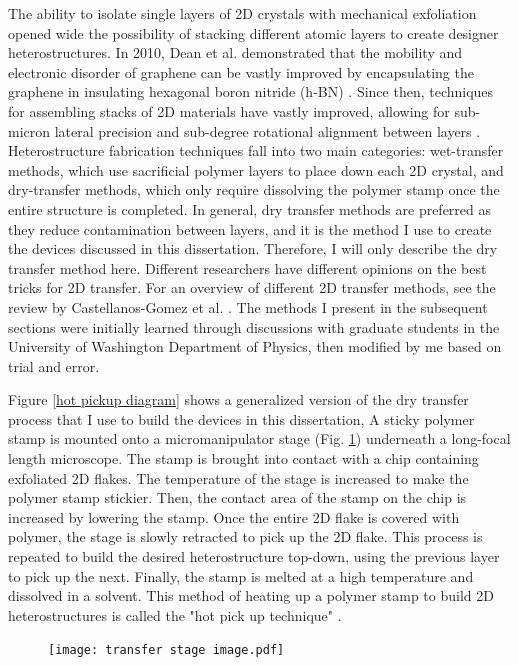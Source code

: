 \documentclass[double,12pt,1in]{beavtex}
\begin{document}
The ability to isolate single layers of 2D crystals with mechanical exfoliation opened wide the possibility of stacking different atomic layers to create designer heterostructures. In 2010, Dean et al. demonstrated that the mobility and electronic disorder of graphene can be vastly improved by encapsulating the graphene in insulating hexagonal boron nitride (h-BN) \cite{dean_boron_2010}. Since then, techniques for assembling stacks of 2D materials have vastly improved, allowing for sub-micron lateral precision and sub-degree rotational alignment between layers \cite{castellanos-gomez_van_2022}. Heterostructure fabrication techniques fall into two main categories: wet-transfer methods, which use sacrificial polymer layers to place down each 2D crystal, and dry-transfer methods, which only require dissolving the polymer stamp once the entire structure is completed. In general, dry transfer methods are preferred as they reduce contamination between layers, and it is the method I use to create the devices discussed in this dissertation. Therefore, I will only describe the dry transfer method here. Different researchers have different opinions on the best tricks for 2D transfer. For an overview of different 2D transfer methods, see the review by Castellanos-Gomez et al.  \cite{castellanos-gomez_van_2022}. The methods I present in the subsequent sections were initially learned through discussions with graduate students in the University of Washington Department of Physics, then modified by me based on trial and error.

Figure \ref{hot pickup diagram} shows a generalized version of the dry transfer process that I use to build the devices in this dissertation, A sticky polymer stamp is mounted onto a micromanipulator stage (Fig. \ref{transfer stage image}) underneath a long-focal length microscope. The stamp is brought into contact with a chip containing exfoliated 2D flakes. The temperature of the stage is increased to make the polymer stamp stickier. Then, the contact area of the stamp on the chip is increased by lowering the stamp. Once the entire 2D flake is covered with polymer, the stage is slowly retracted to pick up the 2D flake. This process is repeated to build the desired heterostructure top-down, using the previous layer to pick up the next. Finally, the stamp is melted at a high temperature and dissolved in a solvent. This method of heating up a polymer stamp to build 2D heterostructures is called the "hot pick up technique" \cite{pizzocchero_hot_2016}.

\begin{figure}
    \texttt{[image: transfer stage image.pdf]}
    \label{transfer stage image}
\end{figure}
\end{document}
